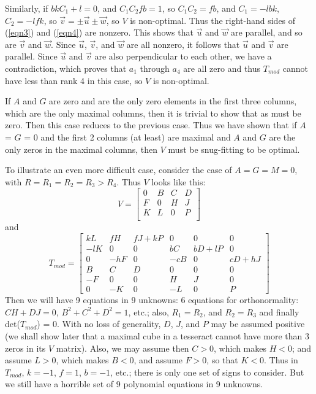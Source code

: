 Similarly, if $b k C_1 + l = 0$, and $C_1 C_2 f b = 1$, so $C_1 C_2 = f b$,
and $C_1 = -l b k$, $C_2 = -l f k$, so $\vec{v} = \pm \vec{u} \pm \vec{w}$, so
$V$ is non-optimal.  Thus the right-hand sides of (\ref{eqn3}) and
(\ref{eqn4}) are nonzero.  This shows that $\vec{u}$ and $\vec{w}$ are
parallel, and so are $\vec{v}$ and $\vec{w}$.  Since $\vec{u}$, $\vec{v}$, and
$\vec{w}$ are all nonzero, it follows that $\vec{u}$ and $\vec{v}$ are
parallel.  Since $\vec{u}$ and $\vec{v}$ are also perpendicular to each other,
we have a contradiction, which proves that $a_1$ through $a_4$ are all zero
and thus $T_{mod}$ cannot have less than rank 4 in this case, so $V$ is
non-optimal.

If $A$ and $G$ are zero and are the only zero elements in the first three
columns, which are the only maximal columns, then it is trivial to show
that as must be zero. Then this case reduces to the previous case. Thus
we have shown that if $A$ = $G$ = 0 and the first 2 columns (at least) are
maximal and $A$ and $G$ are the only zeros in the maximal columns, then $V$
must be snug-fitting to be optimal.

To illustrate an even more difficult case, consider the case of $A = G = M =
0$, with $R = R_1 = R_2 = R_3 > R_4$.  Thus $V$ looks like this:
\begin{equation*}
V =
\begin{bmatrix}
0 & B & C & D \\
F & 0 & H & J \\
K & L & 0 & P \\
\end{bmatrix}
\end{equation*}
and
\begin{equation*}
T_{mod} =
\begin{bmatrix}
 kL &  fH & fJ+kP &   0 &  0    &  0    \\
-lK &   0 &  0    &  bC & bD+lP &  0    \\
  0 & -hF &  0    & -cB &  0    & cD+hJ \\
  B &   C &  D    &   0 &  0    &  0    \\
 -F &   0 &  0    &   H &  J    &  0    \\
  0 &  -K &  0    &  -L &  0    &  P
\end{bmatrix}
\end{equation*}
Then we will have 9 equations in 9 unknowns:  6 equations for orthonormality:
$CH + DJ = 0$, $B^2 + C^2 + D^2 = 1$, etc.; also, $R_1 = R_2$, and $R_2 = R_3$
and finally det($T_{mod}$) = 0.  With no loss of generality, $D$, $J$, and $P$
may be assumed positive (we shall show later that a maximal cube in a
tesseract cannot have more than 3 zeros in its $V$ matrix).  Also, we may
assume then $C > 0$, which makes $H < 0$; and assume $L > 0$, which makes $B <
0$, and assume $F > 0$, so that $K < 0$.  Thus in $T_{mod}$, $k = -1$, $f =
1$, $b = -1$, etc.; there is only one set of signs to consider.  But we still
have a horrible set of 9 polynomial equations in 9 unknowns.

